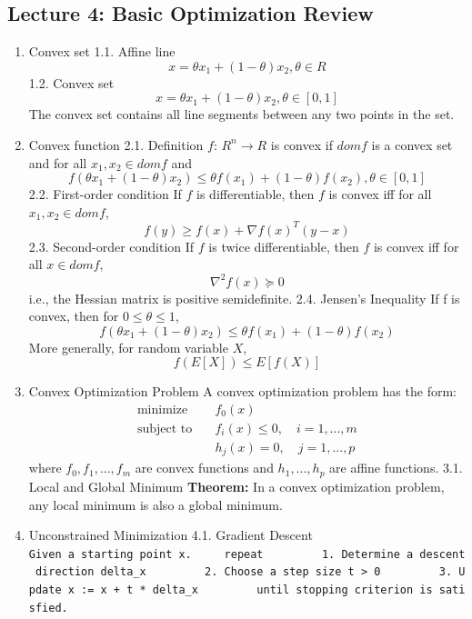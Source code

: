 \documentclass[
]{ctexart}
\begin{document}
\clearpage

\subsection{Lecture 4: Basic Optimization
Review}\label{lecture-4-basic-optimization-review}

\begin{enumerate}
\def\labelenumi{\arabic{enumi}.}
\item
  Convex set 1.1. Affine line
  \[ x = \theta x_1 + (1-\theta)x_2, \theta \in R \] 1.2. Convex set
  \[ x = \theta x_1 + (1-\theta)x_2, \theta \in [0,1] \] The convex set
  contains all line segments between any two points in the set.
\item
  Convex function 2.1. Definition \(f\): \(R^n \rightarrow R\) is convex
  if \(dom f\) is a convex set and for all \(x_1, x_2 \in dom f\) and
  \[ f(\theta x_1 + (1-\theta)x_2) \leq \theta f(x_1) + (1-\theta)f(x_2), \theta \in [0,1] \]
  2.2. First-order condition If \(f\) is differentiable, then \(f\) is
  convex iff for all \(x_1, x_2 \in dom f\),
  \[ f(y) \geq f(x) + \nabla f(x)^T (y - x) \] 2.3. Second-order
  condition If \(f\) is twice differentiable, then \(f\) is convex iff
  for all \(x \in dom f\), \[ \nabla^2 f(x) \succeq 0 \] i.e., the
  Hessian matrix is positive semidefinite. 2.4. Jensen's Inequality If f
  is convex, then for \(0 \leq \theta \leq 1\),
  \[ f(\theta x_1 + (1-\theta)x_2) \leq \theta f(x_1) + (1-\theta)f(x_2) \]
  More generally, for random variable \(X\), \[ f(E[X]) \leq E[f(X)] \]
\item
  Convex Optimization Problem A convex optimization problem has the
  form: \begin{align*}
   \text{minimize} \quad & f_0(x) \\
   \text{subject to} \quad & f_i(x) \leq 0, \quad i = 1, ..., m \\
   & h_j(x) = 0, \quad j = 1, ..., p
\end{align*} where \(f_0, f_1, ..., f_m\) are convex functions and
  \(h_1, ..., h_p\) are affine functions. 3.1. Local and Global Minimum
  \textbf{Theorem:} In a convex optimization problem, any local minimum
  is also a global minimum.
\item
  Unconstrained Minimization 4.1. Gradient Descent
  \texttt{Given\ a\ starting\ point\ x.\ \ \ \ \ repeat\ \ \ \ \ \ \ \ \ 1.\ Determine\ a\ descent\ direction\ delta\_x\ \ \ \ \ \ \ \ \ 2.\ Choose\ a\ step\ size\ t\ \textgreater{}\ 0\ \ \ \ \ \ \ \ \ 3.\ Update\ x\ :=\ x\ +\ t\ *\ delta\_x\ \ \ \ \ \ \ \ \ until\ stopping\ criterion\ is\ satisfied.}


\end{enumerate}
\end{document}
